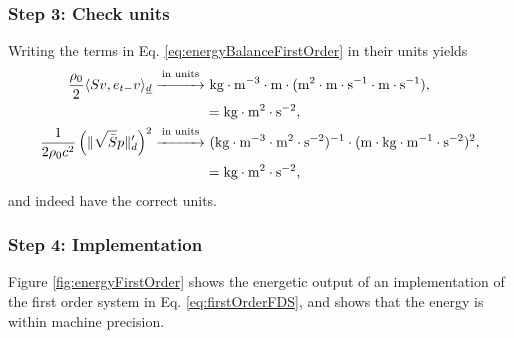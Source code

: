 {\subsubsection{Step 3: Check units}
Writing the terms in Eq. \eqref{eq:energyBalanceFirstOrder} in their units yields
\begin{align*}
    \frac{\rho_0}{2}\langle Sv, e_{t-}v\rangle_{\underline{d}}\overset{\text{in units}}{\xrightarrow{\hspace*{1cm}}}& \ \text{kg}\cdot \text{m}^{-3}\cdot \text{m} \cdot (\text{m}^2 \cdot \text{m}\cdot\text{s}^{-1} \cdot \text{m}\cdot\text{s}^{-1}),\\
    & = \text{kg} \cdot \text{m}^2 \cdot \text{s}^{-2},\\
    \frac{1}{2\rho_0 c^2}\left(\lVert\sqrt{\bar S }p\rVert'_d\right)^2\overset{\text{in units}}{\xrightarrow{\hspace*{1cm}}}&\  (\text{kg} \cdot \text{m}^{-3} \cdot \text{m}^2 \cdot \text{s}^{-2})^{-1} \cdot(\text{m} \cdot \text{kg} \cdot \text{m}^{-1}\cdot \text{s}^{-2})^2,\\
    &= \text{kg} \cdot \text{m}^2 \cdot \text{s}^{-2},
\end{align*}
and indeed have the correct units.
\subsubsection{Step 4: Implementation}
Figure \ref{fig:energyFirstOrder} shows the energetic output of an implementation of the first order system in Eq. \eqref{eq:firstOrderFDS}, and shows that the energy is within machine precision.

\begin{figure}[h]
    \centering
\end{figure}}
